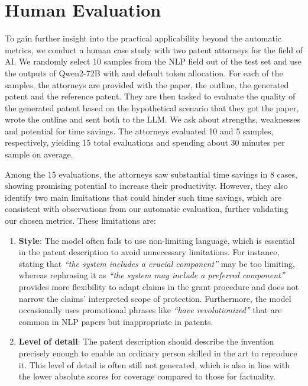 \section{Human Evaluation}\label{sec:human_eval}

To gain further insight into the practical applicability beyond the automatic metrics, we conduct a human case study with two patent attorneys for the field of AI.
We randomly select 10 samples from the NLP
field out of the \DatasetName test set and use the outputs of Qwen2-72B with \MethodName and default token allocation.
For each of the samples, the attorneys are provided with the paper, the outline, the generated patent and the reference patent.
They are then tasked to evaluate the quality of the generated patent based on the hypothetical scenario that they got the paper, wrote the outline and sent both to the LLM.
We ask about strengths, weaknesses and potential for time savings.
The attorneys evaluated 10 and 5 samples, respectively, yielding 15 total evaluations and spending about 30 minutes per sample on average.

Among the 15 evaluations, the attorneys saw substantial time savings in 8 cases, showing promising potential to increase their productivity. 
However, they also identify two main limitations that could hinder such time savings, which are consistent with observations from our automatic evaluation, further validating our chosen metrics. 
These limitations are:

\begin{enumerate}[label=(\arabic*),itemsep=5pt,topsep=5pt,leftmargin=*,wide,labelindent=0pt]
     
\item
\textbf{Style}: The model often fails to use non-limiting language, which is essential in the patent description to avoid unnecessary limitations.
For instance, stating that \textit{\enquote{the system includes a crucial component}} may be too limiting, whereas rephrasing it as \textit{\enquote{the system may include a preferred component}} provides more flexibility to adapt claims in the grant procedure and does not narrow the claims' interpreted scope of protection. 
Furthermore, the model occasionally uses promotional phrases like \textit{\enquote{have revolutionized}} that are common in NLP papers but inappropriate in patents.

\item
\textbf{Level of detail}: The patent description should describe the invention precisely enough to enable an ordinary person skilled in the art to reproduce it.
This level of detail is often still not generated, which is also in line with the lower absolute scores for coverage compared to those for factuality.

\end{enumerate}
